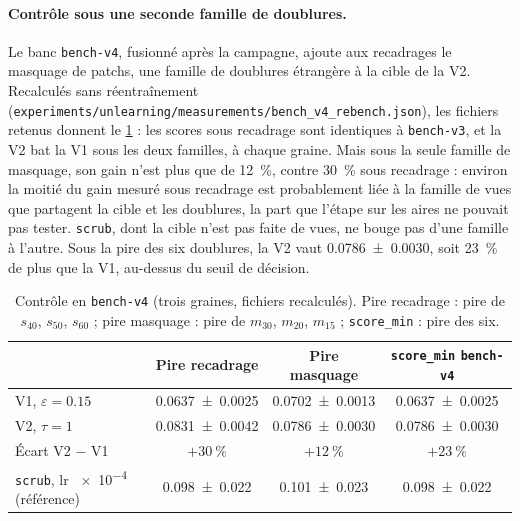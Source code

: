 \documentclass[11pt,a4paper]{article}
\newcommand{\code}[1]{\texttt{#1}}
\newcommand{\chemin}[1]{\nolinkurl{#1}}%
\begin{document}
\paragraph{Contrôle sous une seconde famille de doublures.} Le banc \code{bench-v4}, fusionné après
la campagne, ajoute aux recadrages le masquage de patchs, une famille de doublures étrangère à la
cible de la V2. Recalculés sans réentraînement (\chemin{experiments/unlearning/measurements/bench\_v4\_rebench.json}),
les fichiers retenus donnent le \cref{tab:v4} : les scores sous recadrage sont identiques à
\code{bench-v3}, et la V2 bat la V1 sous les deux familles, à chaque graine. Mais sous la seule
famille de masquage, son gain n'est plus que de \SI{12}{\percent}, contre \SI{30}{\percent} sous
recadrage : environ la moitié du gain mesuré sous recadrage est probablement liée à la famille de
vues que partagent la cible et les doublures, la part que l'étape sur les aires ne pouvait pas
tester. \code{scrub}, dont la cible n'est pas faite de vues, ne bouge pas d'une famille à l'autre.
Sous la pire des six doublures, la V2 vaut \num{0.0786 +- 0.0030}, soit \SI{23}{\percent} de plus que
la V1, au-dessus du seuil de décision.

\begin{table}[ht]
  \centering\small
  \caption{Contrôle en \code{bench-v4} (trois graines, fichiers recalculés). Pire recadrage : pire de
  $s_{40}$, $s_{50}$, $s_{60}$ ; pire masquage : pire de $m_{30}$, $m_{20}$, $m_{15}$ ;
  \code{score\_min} : pire des six.}\label{tab:v4}
  \setlength{\tabcolsep}{5pt}
  \begin{tabular}{@{}lccc@{}}
    \toprule
    & Pire recadrage & Pire masquage & \code{score\_min} \code{bench-v4}\\
    \midrule
    V1, $\varepsilon=\num{0.15}$ & \num{0.0637 +- 0.0025} & \num{0.0702 +- 0.0013} & \num{0.0637 +- 0.0025}\\
    V2, $\tau=1$ & \num{0.0831 +- 0.0042} & \num{0.0786 +- 0.0030} & \num{0.0786 +- 0.0030}\\
    Écart V2 $-$ V1 & $+\SI{30}{\percent}$ & $+\SI{12}{\percent}$ & $+\SI{23}{\percent}$\\
    \midrule
    \code{scrub}, lr \num{e-4} (référence) & \num{0.098 +- 0.022} & \num{0.101 +- 0.023} & \num{0.098 +- 0.022}\\
    \bottomrule
  \end{tabular}
\end{table}
\end{document}
